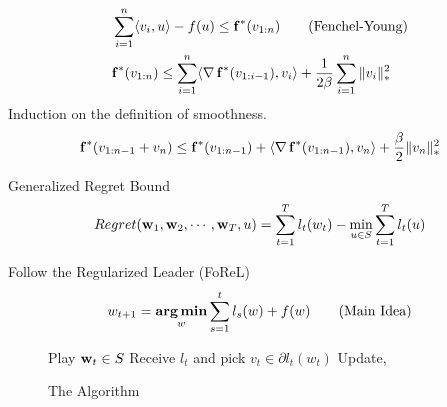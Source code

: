 \begin{frame}
    \begin{align*}
      & \sum_{i=1}^n \langle {v_i} , {u} \rangle - f(u) \le {\operatorname{\mathbf{f}}}^{*}(v_{1:n}) \tag{Fenchel-Young} \\
      & {\operatorname{\mathbf{f}}}^{*}(v_{1:n}) \le \sum_{i=1}^n \langle {\operatorname{\nabla}{\operatorname{\mathbf{f}}}^{*}(v_{1:i-1})} , {v_i} \rangle +\frac{1}{2\beta} \sum_{i=1}^n \|v_i\|_{*}^2
    \end{align*}
    Induction on the definition of smoothness.
    \begin{align*}
      {\operatorname{\mathbf{f}}}^{*}(v_{1:n-1}+v_n) \le {\operatorname{\mathbf{f}}}^{*}(v_{1:n-1}) + \langle {\operatorname{\nabla}{\operatorname{\mathbf{f}}}^{*}(v_{1:n-1})} , {v_n} \rangle +\frac{\beta}{2} \|v_n\|_{*}^2
    \end{align*}

\end{frame}


\begin{frame}{Generalized Regret Bound}
  \begin{align*}
    Regret(\operatorname{\mathbf{w}}_1,\operatorname{\mathbf{w}}_2,\cdots,\operatorname{\mathbf{w}}_T,u) = \sum_{t=1}^T l_t(w_t) - \min_{u \in S} \sum_{t=1}^T l_t(u)
  \end{align*}
\end{frame}

\begin{frame}{Follow the Regularized Leader (FoReL)}
  \begin{align*}
    w_{t+1} = \operatorname*{\mathbf{arg\,min}}_w \sum_{s=1}^t l_s(w) + f(w) \tag{Main Idea}
  \end{align*}
  \begin{figure}
  \begin{algorithmic}[1]
    \State Play $\operatorname{\mathbf{w}}_t \in S$
    \State Receive $l_t$ and pick $v_t \in \partial l_t(w_t)$
    \State Update,
    \EndFor
  \end{algorithmic}
  \caption{The Algorithm}
  \end{figure}
\end{frame}

